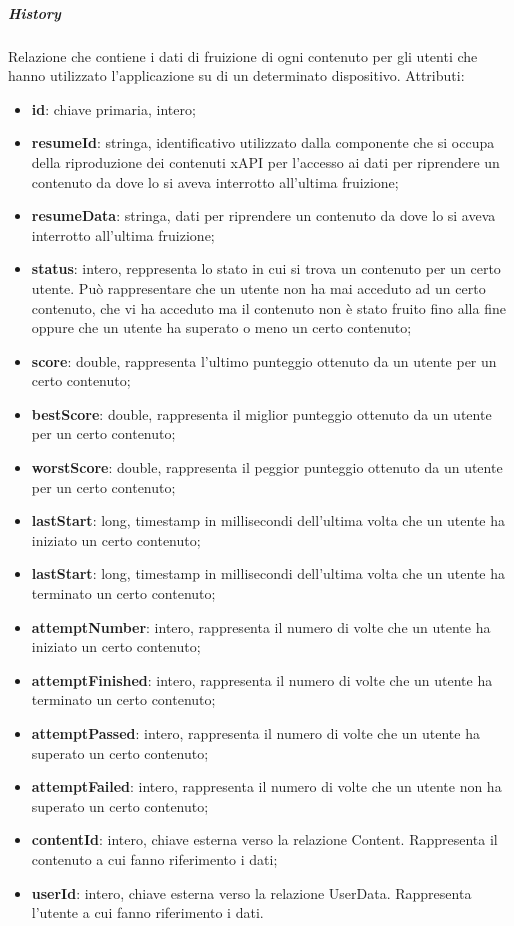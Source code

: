 \documentclass[../Tesi.tex]{subfiles}
\begin{document}
				\subparagraph*{History}
				Relazione che contiene i dati di fruizione di ogni contenuto per gli utenti che hanno utilizzato l'applicazione su di un determinato dispositivo. Attributi:
				\begin{itemize}
					\item \textbf{id}: chiave primaria, intero;
					\item \textbf{resumeId}: stringa, identificativo utilizzato dalla componente che si occupa della riproduzione dei contenuti xAPI per l'accesso ai dati per riprendere un contenuto da dove lo si aveva interrotto all'ultima fruizione;
					\item \textbf{resumeData}: stringa, dati per riprendere un contenuto da dove lo si aveva interrotto all'ultima fruizione;
					\item \textbf{status}: intero, reppresenta lo stato in cui si trova un contenuto per un certo utente. Può rappresentare che un utente non ha mai acceduto ad un certo contenuto, che vi ha acceduto ma il contenuto non è stato fruito fino alla fine oppure che un utente ha superato o meno un certo contenuto;
					\item \textbf{score}: double, rappresenta l'ultimo punteggio ottenuto da un utente per un certo contenuto;
					\item \textbf{bestScore}: double, rappresenta il miglior punteggio ottenuto da un utente per un certo contenuto;
					\item \textbf{worstScore}: double, rappresenta il peggior punteggio ottenuto da un utente per un certo contenuto;
					\item \textbf{lastStart}: long, timestamp in millisecondi dell'ultima volta che un utente ha iniziato un certo contenuto;
					\item \textbf{lastStart}: long, timestamp in millisecondi dell'ultima volta che un utente ha terminato un certo contenuto;
					\item \textbf{attemptNumber}: intero, rappresenta il numero di volte che un utente ha iniziato un certo contenuto;
					\item \textbf{attemptFinished}: intero, rappresenta il numero di volte che un utente ha terminato un certo contenuto;
					\item \textbf{attemptPassed}: intero, rappresenta il numero di volte che un utente ha superato un certo contenuto;
					\item \textbf{attemptFailed}: intero, rappresenta il numero di volte che un utente non ha superato un certo contenuto;
					\item \textbf{contentId}: intero, chiave esterna verso la relazione Content. Rappresenta il contenuto a cui fanno riferimento i dati;
					\item \textbf{userId}: intero, chiave esterna verso la relazione UserData. Rappresenta l'utente a cui fanno riferimento i dati.
				\end{itemize}
\end{document}
